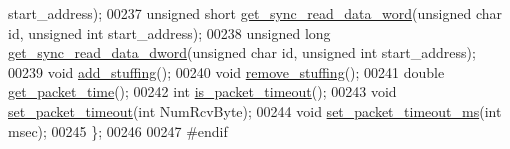 \begin{DoxyCode}
      start\_address);
00237     \textcolor{keywordtype}{unsigned} \textcolor{keywordtype}{short} \hyperlink{classdynamixel2_a5afed0047167b1a4262d7fb961faa488}{get\_sync\_read\_data\_word}(\textcolor{keywordtype}{unsigned} \textcolor{keywordtype}{char} \textcolor{keywordtype}{id}, \textcolor{keywordtype}{unsigned} \textcolor{keywordtype}{int} 
      start\_address);
00238     \textcolor{keywordtype}{unsigned} \textcolor{keywordtype}{long}  \hyperlink{classdynamixel2_a4f25408bacde5a8a3b00b2f7f79f0202}{get\_sync\_read\_data\_dword}(\textcolor{keywordtype}{unsigned} \textcolor{keywordtype}{char} \textcolor{keywordtype}{id}, \textcolor{keywordtype}{unsigned} \textcolor{keywordtype}{int} 
      start\_address);
00239     \textcolor{keywordtype}{void} \hyperlink{classdynamixel2_a350920b911d0ad2116b91f2149b840c7}{add\_stuffing}();
00240     \textcolor{keywordtype}{void} \hyperlink{classdynamixel2_a910c7b80ace3a816641468b32c0290a6}{remove\_stuffing}();
00241     \textcolor{keywordtype}{double} \hyperlink{classdynamixel2_a7d4d98424dc85511970e9a405b919594}{get\_packet\_time}();
00242     \textcolor{keywordtype}{int} \hyperlink{classdynamixel2_a4c996c0d9edcfd320906674512837a9e}{is\_packet\_timeout}();
00243     \textcolor{keywordtype}{void} \hyperlink{classdynamixel2_a132d723a321ba225f75f2c79e5d4d27b}{set\_packet\_timeout}(\textcolor{keywordtype}{int} NumRcvByte);
00244     \textcolor{keywordtype}{void} \hyperlink{classdynamixel2_a7d85d44aa6c1fe51f952f395a79296d5}{set\_packet\_timeout\_ms}(\textcolor{keywordtype}{int} msec);
00245 \};
00246 
00247 \textcolor{preprocessor}{#endif}
\end{DoxyCode}
